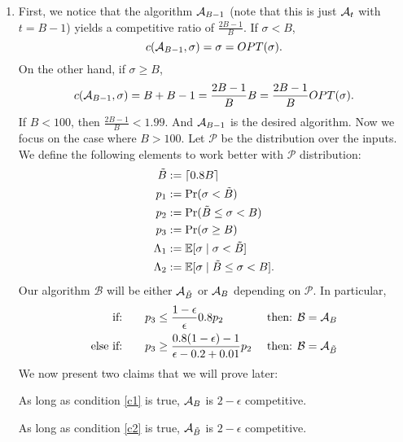 \documentclass[11pt]{article}
\begin{document}
\begin{enumerate}
    \item First, we notice that the algorithm $\mathcal{A}_{B-1}$ (note that this is just $\mathcal{A}_t$ with $t = B-1$) yields a competitive ratio of $\frac{2B-1}{B}$. If $\sigma < B$,
    \begin{equation*}
        c(\mathcal{A}_{B-1}, \sigma) = \sigma = OPT(\sigma).
    \end{equation*}
    On the other hand, if $\sigma \geq B$, 
    \begin{equation*}
        c(\mathcal{A}_{B-1}, \sigma) = B+B-1 = \frac{2B-1}{B}B=\frac{2B-1}{B}OPT(\sigma).
    \end{equation*}
    If $B<100$, then $\frac{2B-1}{B} < 1.99$. And $\mathcal{A}_{B-1}$ is the desired algorithm. Now we focus on the case where $B > 100$. Let $\mathcal P$ be the distribution over the inputs. We define the following elements to work better with $\mathcal{P}$ distribution:
    \begin{align*}
        \tilde B &:= \lceil0.8B \rceil\\
        p_1 &:= \Pr( \sigma <  \tilde B)\\
        p_2 &:= \Pr(\tilde B \leq \sigma <  B)\\
        p_3 &:= \Pr( \sigma \geq B)\\
        \Lambda_1 &:= \mathbb{E}[\sigma \mid \sigma <  \tilde B]\\
        \Lambda_2 &:= \mathbb{E}[\sigma \mid \tilde B \leq \sigma <  B].
    \end{align*}
    Our algorithm $\mathcal {B}$ will be either $\mathcal{A}_{\tilde B}$ or $\mathcal{A}_{B}$ depending on $\mathcal P$. In particular,
    \begin{align}
        \text{if:}&\qquad p_3 \leq \frac{1-\epsilon}{\epsilon} 0.8 p_2 &\text{ then: } \mathcal{B} = \mathcal{A}_{B} \label{c1}\\
        \text{else if:}&\qquad p_3 \geq \frac{0.8(1-\epsilon)-1}{\epsilon- 0.2 + 0.01}p_2 &\text{ then: } \mathcal{B} = \mathcal{A}_{\tilde{B}}\label{c2}
    \end{align} 
    We now present two claims that we will prove later:
    \begin{claim}\label{cl1} As long as condition \ref{c1} is true, $\mathcal{A}_B$ is $2-\epsilon$ competitive.
    \end{claim}
    \begin{claim}\label{cl2} As long as condition \ref{c2} is true, $\mathcal{A}_{\tilde B}$ is $2-\epsilon$ competitive.
    \end{claim}


\end{enumerate}
\end{document}
